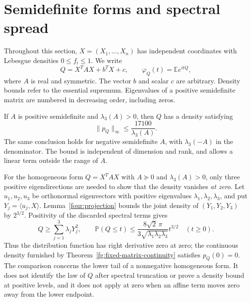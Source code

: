 \section{Semidefinite forms and spectral spread}
\label{sec:semidefinite}

Throughout this section, $X=(X_1,\ldots,X_n)$ has independent coordinates
with Lebesgue densities $0\leq f_i\leq1$.  We write
\[
 Q=X^TAX+b^TX+c,\qquad \varphi_Q(t)=\mathbb E e^{itQ},
\]
where $A$ is real and symmetric.  The vector $b$ and scalar $c$ are
arbitrary.  Density bounds refer to the essential supremum.  Eigenvalues
of a positive semidefinite matrix are numbered in decreasing order,
including zeros.

\begin{theorem}\label{sd:main}
If $A$ is positive semidefinite and $\lambda_3(A)>0$, then $Q$ has a
density satisfying
\begin{equation}\label{sd:main-bound}
 \|p_Q\|_\infty\leq \frac{17100}{\lambda_3(A)}.
\end{equation}
The same conclusion holds for negative semidefinite $A$, with
$\lambda_3(-A)$ in the denominator.  The bound is independent of dimension
and rank, and allows a linear term outside the range of $A$.
\end{theorem}

\begin{remark}\label{sd:endpoint-zero}
For the homogeneous form $Q=X^TAX$ with $A\succeq0$ and
$\lambda_3(A)>0$, only three positive eigendirections are needed to
show that the density vanishes \emph{at zero}.  Let $u_1,u_2,u_3$
be orthonormal eigenvectors with positive eigenvalues
$\lambda_1,\lambda_2,\lambda_3$, and put
$Y_j=\langle u_j,X\rangle$.  Lemma~\ref{four:projection} bounds the
joint density of $(Y_1,Y_2,Y_3)$ by $2^{3/2}$.  Positivity of the
discarded spectral terms gives
\[
 Q\geq\sum_{j=1}^3\lambda_jY_j^2,
 \qquad
 \mathbb P(Q\leq t)
 \leq \frac{8\sqrt2\,\pi}{3\sqrt{\lambda_1\lambda_2\lambda_3}}
       t^{3/2}\quad(t\geq0).
\]
Thus the distribution function has right derivative zero at zero;
the continuous density furnished by
Theorem~\ref{fg:fixed-matrix-continuity} satisfies $p_Q(0)=0$.
The comparison concerns the lower tail of a nonnegative homogeneous
form.  It does not identify the law of $Q$ after spectral truncation
or prove a density bound at positive levels, and it does not apply at
zero when an affine term moves zero away from the lower endpoint.
\end{remark}

